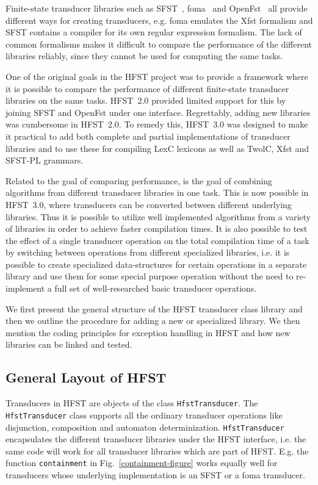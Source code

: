 \documentclass{llncs}
\begin{document}
Finite-state transducer libraries such as SFST~\cite{schmid/2005},
foma~\cite{hulden/2009} and OpenFst~\cite{openfst/2007} all provide
different ways for creating transducers, e.g. foma emulates the Xfst
formalism and SFST contains a compiler for its own regular expression
formalism. The lack of common formalisms makes it difficult to compare
the performance of the different libraries reliably, since they cannot
be used for computing the same tasks. 
 
One of the original goals in the HFST project was to provide a
framework where it is possible to compare the performance of different
finite-state transducer libraries on the same tasks. HFST~2.0 provided
limited support for this by joining SFST and OpenFst under one
interface. Regrettably, adding new libraries was cumbersome in HFST~2.0. 
To remedy this, HFST~3.0 was designed to make it practical to add both
complete and partial implementations of transducer libraries and to use
these for compiling LexC lexicons as well as TwolC, Xfst and SFST-PL grammars.

Related to the goal of comparing performance, is the goal of combining
algorithms from different transducer libraries in one task. This is
now possible in HFST~3.0, where transducers can be converted between
different underlying libraries. Thus it is possible to utilize well
implemented algorithms from a variety of libraries in order to achieve
faster compilation times. It is also possible to test the effect of a
single transducer operation on the total compilation time of a task by
switching between operations from different specialized libraries, i.e. 
it is possible to create specialized data-structures for certain operations 
in a separate library and use them for some special purpose operation 
without the need to re-implement a full set of well-researched 
basic transducer operations.

We first present the general structure of the HFST transducer class library
and then we outline the procedure for adding a new or specialized library.
We then mention the coding principles for exception handling in HFST and
how new libraries can be linked and tested.

\subsection{General Layout of HFST}

Transducers in HFST are objects of the class {\tt HfstTransducer}. The
{\tt HfstTrans\-ducer} class supports all the ordinary transducer
operations like disjunction, composition and automaton determinization. 
{\tt HfstTransducer} encapsulates the different transducer
libraries under the HFST interface, i.e. the same code will work for all
transducer libraries which are part of HFST. E.g. the function {\tt containment} 
in Fig.~\ref{containment-figure} works equally well for transducers whose 
underlying implementation is an SFST or a foma transducer.
\end{document}
